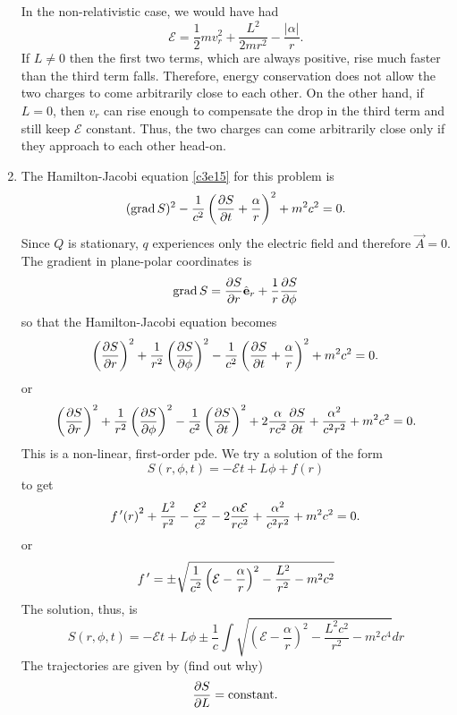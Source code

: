\begin{enumerate}
In the non-relativistic case, we would have had
\[
\mathcal{E} = \frac{1}{2}mv_r^2 + \frac{L^2}{2mr^2} - \frac{|\alpha|}{r}.
\]
If $L \ne 0$ then the first two terms, which are always positive, rise much faster
than the third term falls. Therefore, energy conservation does not allow the two
charges to come arbitrarily close to each other. On the other hand, if $L = 0$, 
then $v_r$ can rise enough to compensate the drop in the third term and still
keep  $\mathcal{E}$ constant. Thus, the two charges can come arbitrarily close only
if they approach to each other head-on.

\item The Hamilton-Jacobi equation \eqref{c3e15} for this problem is
\[
(\operatorname{grad} S)^2 - \frac{1}{c^2}\left(\frac{\partial{S}}{\partial{t}} + \frac{\alpha}{r}\right)^2 + m^2c^2 = 0.
\]
Since $Q$ is stationary, $q$ experiences only the electric field and therefore 
$\vec{A} = 0$. The gradient in plane-polar coordinates is
\begin{equation}\label{c5e66}
\operatorname{grad} S = \frac{\partial{S}}{\partial{r}}\hat{\mathbf{e}}_{r} + \frac{1}{r}\frac{\partial{S}}{\partial{\phi}}
\end{equation}
so that the Hamilton-Jacobi equation becomes
\begin{equation}\label{c5e67}
\left(\frac{\partial{S}}{\partial{r}}\right)^2 + \frac{1}{r^2}\left(\frac{\partial{S}}{\partial{\phi}}\right)^2 - \frac{1}{c^2}
\left(\frac{\partial{S}}{\partial{t}} + \frac{\alpha}{r}\right)^2 + m^2c^2 = 0.
\end{equation}
or
\[
\left(\frac{\partial{S}}{\partial{r}}\right)^2 + \frac{1}{r^2}\left(\frac{\partial{S}}{\partial{\phi}}\right)^2 - \frac{1}{c^2}
\left(\frac{\partial{S}}{\partial{t}}\right)^2 + 2\frac{\alpha}{rc^2}\frac{\partial{S}}{\partial{t}} + \frac{\alpha^2}{c^2r^2}
+ m^2c^2 = 0.
\]
This is a non-linear, first-order pde. We try a solution of the form
\begin{equation}\label{c5e68}
S(r, \phi, t) = -\mathcal{E}t + L\phi + f(r)
\end{equation}
to get
\[
{f^{\,\prime}(r)}^2 + \frac{L^2}{r^2} - \frac{\mathcal{E}^2}{c^2} - 2\frac{\alpha\mathcal{E}}{rc^2}
+ \frac{\alpha^2}{c^2r^2} + m^2c^2 = 0.
\]
or
\[
f^{\,\prime} = \pm\sqrt{\frac{1}{c^2}\left(\mathcal{E} - \frac{\alpha}{r}\right)^2 - \frac{L^2}{r^2} 
-m^2c^2}
\]
The solution, thus, is
\begin{equation}\label{c5e69}
S(r, \phi, t) = -\mathcal{E}t + L\phi \pm 
\frac{1}{c}\int\sqrt{\left(\mathcal{E}-\frac{\alpha}{r}\right)^2-\frac{L^2c^2}{r^2} -m^2c^4}dr
\end{equation}
The trajectories are given by (find out why)
\begin{equation}\label{c5e70}
\frac{\partial{S}}{\partial{L}} = \text{constant.}
\end{equation}

\end{enumerate}
